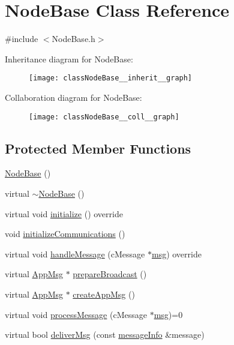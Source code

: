 \hypertarget{classNodeBase}{}\section{Node\+Base Class Reference}
\label{classNodeBase}


{\ttfamily \#include $<$Node\+Base.\+h$>$}



Inheritance diagram for Node\+Base\+:\nopagebreak
\begin{figure}[H]
\begin{center}
\leavevmode
\texttt{[image: classNodeBase\_\_inherit\_\_graph]}
\end{center}
\end{figure}


Collaboration diagram for Node\+Base\+:\nopagebreak
\begin{figure}[H]
\begin{center}
\leavevmode
\texttt{[image: classNodeBase\_\_coll\_\_graph]}
\end{center}
\end{figure}
\subsection*{Protected Member Functions}
\begin{DoxyCompactItemize}
\item 
\hyperlink{classNodeBase_ab6ea4e77947d5b9b8da66d37dc432e7f}{Node\+Base} ()
\item 
virtual \hyperlink{classNodeBase_a2fd7f7080282b6af95ba0b09fd30679d}{$\sim$\+Node\+Base} ()
\item 
virtual void \hyperlink{classNodeBase_af7910c39553111295b66c88742d1198a}{initialize} () override
\item 
void \hyperlink{classNodeBase_a2077b2a599f55050603268dbf8fff6a7}{initialize\+Communications} ()
\item 
virtual void \hyperlink{classNodeBase_add2450264be5dd616f9f9ac94e83b988}{handle\+Message} (c\+Message $\ast$\hyperlink{Controller_8h_afa0f3b802fbc219228f7bb97996fa558}{msg}) override
\item 
virtual \hyperlink{classAppMsg}{App\+Msg} $\ast$ \hyperlink{classNodeBase_a66c1dee9d15119bc3e68da71067ff6cd}{prepare\+Broadcast} ()
\item 
virtual \hyperlink{classAppMsg}{App\+Msg} $\ast$ \hyperlink{classNodeBase_ac8b9e21b1cc32fd86aaa6c956b93a7c3}{create\+App\+Msg} ()
\item 
virtual void \hyperlink{classNodeBase_ae70b168f2bc7407c249594b1c614301c}{process\+Message} (c\+Message $\ast$\hyperlink{Controller_8h_afa0f3b802fbc219228f7bb97996fa558}{msg})=0
\item 
virtual bool \hyperlink{classNodeBase_a49052382add1123da26db6bfb687d254}{deliver\+Msg} (const \hyperlink{structures_8h_a7e7bdc1d2fff8a9436f2f352b2711ed6}{message\+Info} \&message)
\end{DoxyCompactItemize}
